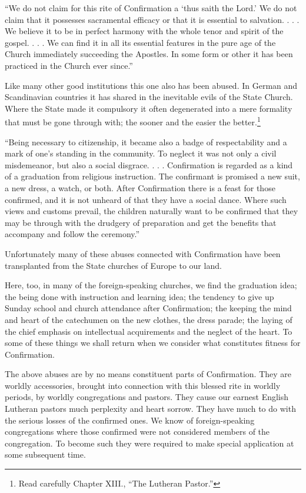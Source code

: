 “We do not claim for this rite of Confirmation
a ‘thus saith the Lord.’ We do not claim that it possesses sacramental efficacy or that it is essential to salvation. . . . We believe it to be in perfect harmony with the whole tenor and spirit of the gospel. . . . We can find it in all its essential features in the pure age of the Church immediately succeeding the Apostles. In some form or other it has been practiced in the Church ever since.”

Like many other good institutions this one also has been abused. In German and Scandinavian countries it has shared in the inevitable evils of the State Church. Where the State made it compulsory it often degenerated into a mere formality that must be gone through with; the sooner and the easier the better.\footnote{Read carefully Chapter XIII., “The Lutheran Pastor.”}

“Being necessary to citizenship,  it became also a badge of respectability and a mark of one’s standing in the community. To neglect it was not only a civil misdemeanor, but also a social disgrace. . . . Confirmation is regarded as a kind of a graduation from religious instruction. The confirmant is promised a new suit, a new dress, a watch, or both. After Confirmation there is a feast for those confirmed, and it is not unheard of that they have a social dance. Where such views and customs prevail, the children naturally want to be confirmed that they may be through with the drudgery of preparation and get
the benefits that accompany and follow the ceremony.”

Unfortunately many of these abuses connected with Confirmation have been transplanted from the State churches of Europe to our land.

Here, too, in many of the foreign-speaking churches, we find the graduation idea; the being done with instruction and learning idea; the tendency to give up Sunday school and church attendance after Confirmation; the keeping the mind and heart of the catechumen on the new clothes, the dress parade; the laying of the chief emphasis on intellectual acquirements and the neglect of the heart. To some of these things we shall return when we consider what constitutes fitness for Confirmation.

The above abuses are by no means constituent parts of Confirmation. They are worldly accessories, brought into connection with this blessed rite in worldly periods, by worldly congregations and pastors. They cause our earnest English Lutheran pastors much perplexity and heart sorrow. They have much to do with the serious losses of the confirmed ones. We know of foreign-speaking congregations where those confirmed were not considered members of the congregation. To become such they were required to make special application at some subsequent time.

